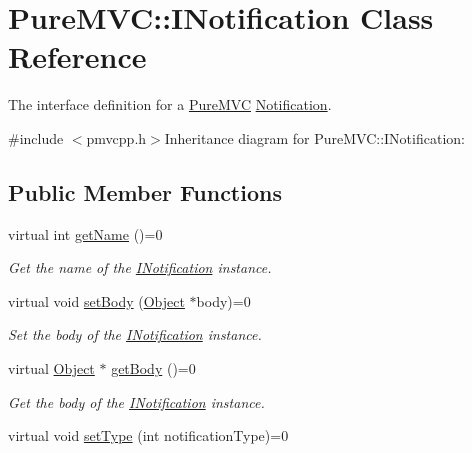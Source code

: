 \hypertarget{class_pure_m_v_c_1_1_i_notification}{
\section{PureMVC::INotification Class Reference}
\label{class_pure_m_v_c_1_1_i_notification}
}


The interface definition for a \hyperlink{namespace_pure_m_v_c}{PureMVC} \hyperlink{class_pure_m_v_c_1_1_notification}{Notification}.  


{\ttfamily \#include $<$pmvcpp.h$>$}Inheritance diagram for PureMVC::INotification:\subsection*{Public Member Functions}
\begin{DoxyCompactItemize}
\item 
virtual int \hyperlink{class_pure_m_v_c_1_1_i_notification_a47236c554cb055f0d422270abc65778b}{getName} ()=0
\begin{DoxyCompactList}\small\item\em Get the name of the {\ttfamily \hyperlink{class_pure_m_v_c_1_1_i_notification}{INotification}} instance. \item\end{DoxyCompactList}\item 
virtual void \hyperlink{class_pure_m_v_c_1_1_i_notification_a3f5eab942b48a0a8d8045701ed98de83}{setBody} (\hyperlink{class_pure_m_v_c_1_1_object}{Object} $\ast$body)=0
\begin{DoxyCompactList}\small\item\em Set the body of the {\ttfamily \hyperlink{class_pure_m_v_c_1_1_i_notification}{INotification}} instance. \item\end{DoxyCompactList}\item 
virtual \hyperlink{class_pure_m_v_c_1_1_object}{Object} $\ast$ \hyperlink{class_pure_m_v_c_1_1_i_notification_a175f91568692855cdeb2642156d34e05}{getBody} ()=0
\begin{DoxyCompactList}\small\item\em Get the body of the {\ttfamily \hyperlink{class_pure_m_v_c_1_1_i_notification}{INotification}} instance. \item\end{DoxyCompactList}\item 
virtual void \hyperlink{class_pure_m_v_c_1_1_i_notification_a2e9d5946b96b759c2f3799377ea4acdc}{setType} (int notificationType)=0

\end{DoxyCompactItemize}
